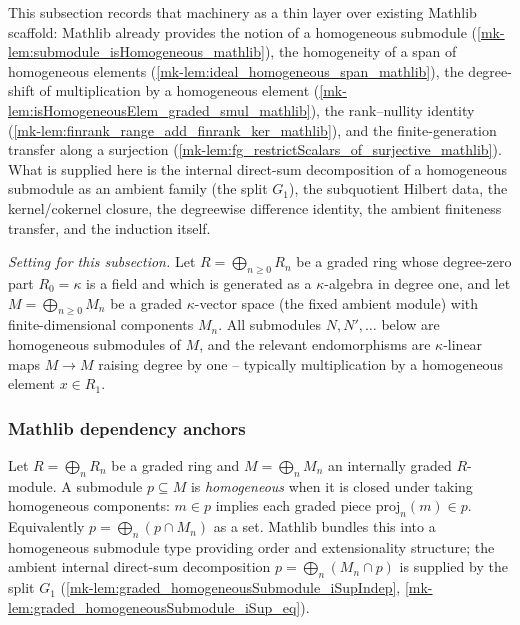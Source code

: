 This subsection records that machinery as a thin layer over existing Mathlib
scaffold: Mathlib already provides the notion of a homogeneous submodule
(\ref{mk-lem:submodule_isHomogeneous_mathlib}), the homogeneity of a span of
homogeneous elements (\ref{mk-lem:ideal_homogeneous_span_mathlib}), the degree-shift
of multiplication by a homogeneous element
(\ref{mk-lem:isHomogeneousElem_graded_smul_mathlib}), the rank--nullity identity
(\ref{mk-lem:finrank_range_add_finrank_ker_mathlib}), and the finite-generation
transfer along a surjection (\ref{mk-lem:fg_restrictScalars_of_surjective_mathlib}).
What is supplied here is the internal direct-sum decomposition of a homogeneous
submodule as an ambient family (the split \(G_1\)), the subquotient Hilbert data,
the kernel/cokernel closure, the degreewise difference identity, the ambient
finiteness transfer, and the induction itself.

\emph{Setting for this subsection.} Let \(R = \bigoplus_{n \ge 0} R_n\) be a graded
ring whose degree-zero part \(R_0 = \kappa\) is a field and which is generated as a
\(\kappa\)-algebra in degree one, and let \(M = \bigoplus_{n \ge 0} M_n\) be a graded
\(\kappa\)-vector space (the fixed ambient module) with finite-dimensional
components \(M_n\). All submodules \(N, N', \dots\) below are homogeneous submodules
of \(M\), and the relevant endomorphisms are \(\kappa\)-linear maps \(M \to M\)
raising degree by one -- typically multiplication by a homogeneous element
\(x \in R_1\).

\subsubsection*{Mathlib dependency anchors}

\begin{lemma}
  \label{mk-lem:submodule_isHomogeneous_mathlib}
  \mathlibok

  Let \(R = \bigoplus_n R_n\) be a graded ring and \(M = \bigoplus_n M_n\) an
  internally graded \(R\)-module. A submodule \(p \subseteq M\) is
  \emph{homogeneous} when it is closed under taking homogeneous components:
  \(m \in p\) implies each graded piece \(\mathrm{proj}_n(m) \in p\). Equivalently
  \(p = \bigoplus_n (p \cap M_n)\) as a set. Mathlib bundles this into a homogeneous
  submodule type providing order and extensionality structure; the ambient internal
  direct-sum decomposition \(p = \bigoplus_n (M_n \cap p)\) is supplied by the split
  \(G_1\) (\ref{mk-lem:graded_homogeneousSubmodule_iSupIndep},
  \ref{mk-lem:graded_homogeneousSubmodule_iSup_eq}).
\end{lemma}

